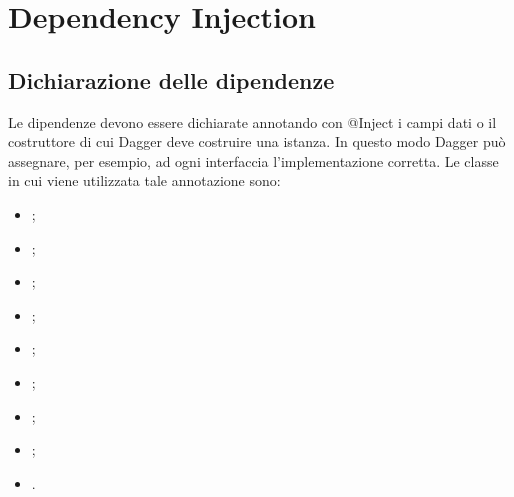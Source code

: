 \documentclass[../ManualeSviluppatore.tex]{subfiles}
\begin{document}
\section{Dependency Injection}
	\subsection{Dichiarazione delle dipendenze}
	Le dipendenze devono essere dichiarate annotando con @Inject i campi dati o il costruttore di cui Dagger deve costruire una istanza. In questo modo Dagger può assegnare, per esempio, ad ogni interfaccia l'implementazione corretta. Le classe in cui viene utilizzata tale annotazione sono:
	\begin{itemize}
		\item \HomeActivity;
		\item \DeveloperUnlockerActivity;
		\item \LogInformationActivity;
		\item \MainDeveloperActivity;
		\item \MainDeveloperPresenter;
		\item \MyApplication;
		\item \NavigationActivity;
		\item \NearbyPoiActivity;
		\item \PoiCategoryActivity.
	\end{itemize}
\end{document}
